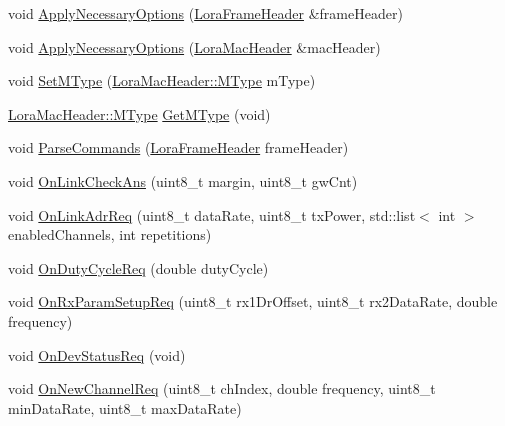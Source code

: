 \begin{DoxyCompactItemize}
void \hyperlink{classns3_1_1lorawan_1_1EndDeviceLoraMac_ac6144c66067865ab2f10a10fb3373139}{Apply\+Necessary\+Options} (\hyperlink{classns3_1_1lorawan_1_1LoraFrameHeader}{Lora\+Frame\+Header} \&frame\+Header)
\item 
void \hyperlink{classns3_1_1lorawan_1_1EndDeviceLoraMac_a5bc2f6e706621d52e20da44af99ba8e6}{Apply\+Necessary\+Options} (\hyperlink{classns3_1_1lorawan_1_1LoraMacHeader}{Lora\+Mac\+Header} \&mac\+Header)
\item 
void \hyperlink{classns3_1_1lorawan_1_1EndDeviceLoraMac_ac1142dacc77786c0e83d364c30a61900}{Set\+M\+Type} (\hyperlink{classns3_1_1lorawan_1_1LoraMacHeader_afd050ac67eab24871452323799e07e94}{Lora\+Mac\+Header\+::\+M\+Type} m\+Type)
\item 
\hyperlink{classns3_1_1lorawan_1_1LoraMacHeader_afd050ac67eab24871452323799e07e94}{Lora\+Mac\+Header\+::\+M\+Type} \hyperlink{classns3_1_1lorawan_1_1EndDeviceLoraMac_a71370a25ca078710f64b80e5d6316263}{Get\+M\+Type} (void)
\item 
void \hyperlink{classns3_1_1lorawan_1_1EndDeviceLoraMac_a7ca5d196ac64e1dfdddd8738f8d1cfbb}{Parse\+Commands} (\hyperlink{classns3_1_1lorawan_1_1LoraFrameHeader}{Lora\+Frame\+Header} frame\+Header)
\item 
void \hyperlink{classns3_1_1lorawan_1_1EndDeviceLoraMac_acab0de0c72baf1bd80108b82dd953874}{On\+Link\+Check\+Ans} (uint8\+\_\+t margin, uint8\+\_\+t gw\+Cnt)
\item 
void \hyperlink{classns3_1_1lorawan_1_1EndDeviceLoraMac_a0564c4a7980faf203e20ef78d847b66f}{On\+Link\+Adr\+Req} (uint8\+\_\+t data\+Rate, uint8\+\_\+t tx\+Power, std\+::list$<$ int $>$ enabled\+Channels, int repetitions)
\item 
void \hyperlink{classns3_1_1lorawan_1_1EndDeviceLoraMac_ab00b3b62618312878a3e231d08e011d9}{On\+Duty\+Cycle\+Req} (double duty\+Cycle)
\item 
void \hyperlink{classns3_1_1lorawan_1_1EndDeviceLoraMac_abe423a1fb1a82c2264f362670197eb55}{On\+Rx\+Param\+Setup\+Req} (uint8\+\_\+t rx1\+Dr\+Offset, uint8\+\_\+t rx2\+Data\+Rate, double frequency)
\item 
void \hyperlink{classns3_1_1lorawan_1_1EndDeviceLoraMac_a46ee940bbd3311012614b352761158df}{On\+Dev\+Status\+Req} (void)
\item 
void \hyperlink{classns3_1_1lorawan_1_1EndDeviceLoraMac_a394c957d5dd4c8e35e431dd26d276995}{On\+New\+Channel\+Req} (uint8\+\_\+t ch\+Index, double frequency, uint8\+\_\+t min\+Data\+Rate, uint8\+\_\+t max\+Data\+Rate)
\item 

\end{DoxyCompactItemize}

